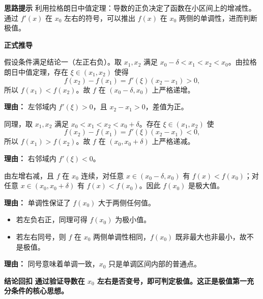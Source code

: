 \begin{proofbox}
	\textbf{\textcolor{CProof}{思路提示}}
	利用拉格朗日中值定理：导数的正负决定了函数在小区间上的增减性。通过 $f'(x)$ 在 $x_0$ 左右的符号，可以推出 $f(x)$ 在 $x_0$ 两侧的单调性，进而判断极值。

	\medskip
	\textbf{\textcolor{CProof}{正式推导}}
	\begin{description}[style=nextline, leftmargin=2.8em, labelsep=0.5em, itemsep=0.55em]
		\item[\textbf{步骤一（左增推理）：}]
			假设条件满足结论一（左正右负）。取 $x_1,x_2$ 满足 $x_0-\delta<x_1<x_2<x_0$。由拉格朗日中值定理，存在 $\xi\in(x_1,x_2)$ 使得
			\[
				f(x_2)-f(x_1)=f'(\xi)(x_2-x_1)>0,
			\]
			所以 $f(x_1)<f(x_2)$。故 $f$ 在 $(x_0-\delta,x_0)$ 上严格递增。
			\par\textbf{理由：} 左邻域内 $f'(\xi)>0$，且 $x_2-x_1>0$，差值为正。
		\item[\textbf{步骤二（右减推理）：}]
			同理，取 $x_1,x_2$ 满足 $x_0<x_1<x_2<x_0+\delta$。存在 $\xi\in(x_1,x_2)$ 使
			\[
				f(x_2)-f(x_1)=f'(\xi)(x_2-x_1)<0,
			\]
			所以 $f(x_1)>f(x_2)$。故 $f$ 在 $(x_0,x_0+\delta)$ 上严格递减。
			\par\textbf{理由：} 右邻域内 $f'(\xi)<0$。
		\item[\textbf{步骤三（极大值结论）：}]
			由左增右减，且 $f$ 在 $x_0$ 连续，对任意 $x\in(x_0-\delta,x_0)$ 有 $f(x)<f(x_0)$；对任意 $x\in(x_0,x_0+\delta)$ 有 $f(x)<f(x_0)$。因此 $f(x_0)$ 是极大值。
			\par\textbf{理由：} 单调性保证了 $f(x_0)$ 大于两侧任何值。
		\item[\textbf{步骤四（其余情况同理）：}]
			\begin{itemize}[leftmargin=*]
			\item 若左负右正，同理可得 $f(x_0)$ 为极小值。
			\item 若左右同号，则 $f$ 在 $x_0$ 两侧单调性相同，$f(x_0)$ 既非最大也非最小，故不是极值。
		\end{itemize}
			\par\textbf{理由：} 同号意味着单调一致，$x_0$ 只是单调区间内部的普通点。
	\end{description}

	\medskip
	\textbf{\textcolor{CProof}{结论回扣}}
	\textbf{通过验证导数在 $x_0$ 左右是否变号，即可判定极值。这正是极值第一充分条件的核心思想。}
\end{proofbox}
